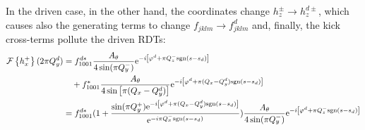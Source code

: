 %
In the driven case, in the other hand, the coordinates change $h_z^\pm \rightarrow h_z^{d\pm}$, which
causes also the generating terms to change $f_{jklm} \rightarrow f^d_{jklm}$ and, finally, the kick
cross-terms pollute the driven RDTs:
%
\begin{align}
    \mathcal{F} \left\{ h_x^+ \right\}(2\pi Q_y^d)
    &=
    {f^{d*}_{1001}}\frac{A_\theta}{4 \sin(\pi Q_y^-)}
        \text{e}^{-i\left[ \varphi^d + \pi Q_z^- \text{sgn}(s-s_d)\right]}
        \notag \\ &\quad
    + f^*_{1001} \frac{A_\theta}{4\sin\left[ \pi(Q_x-Q_y^d) \right]}
        \text{e}^{-i\left[ \varphi^d + \pi (Q_x-Q_y^d) \text{sgn}(s-s_d)\right]}
        \notag \\
        &= f^{d*}_{1001} 
        (
            1 + 
        \frac{
            \sin(\pi Q_y^+)
            \text{e}^{-i\left[ \varphi^d + \pi (Q_x-Q_y^d) \text{sgn}(s-s_d)\right]}
        }{
            \text{e}^{-i\pi Q_x^-\text{sgn}(s-s_d)}
        }
        )
    \frac{A_\theta}{4 \sin(\pi Q_y^-)}
        \text{e}^{-i\left[ \varphi^d + \pi Q_z^- \text{sgn}(s-s_d)\right]}
\end{align}
